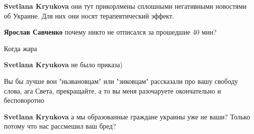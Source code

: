\begin{itemize}
\begin{itemize}
 
\textbf{Svetlana Kryukova} они тут прикорлмены сплошными негативными новостями об Украине. Для них они носят терапевтический эффект.


 
\textbf{Ярослав Савченко} почему никто не отписался за прошедшие 40 мин?

 
Когда жара

 
\textbf{Svetlana Kryukova} не было приказа)

 
Вы бы лучше вон "ньзвановцам" или "зиковцам" рассказали про вашу свободу слова,
ага \Laughey[1.0][white] Света, прекращайте, а то вы меня разочаруете окончательно и бесповоротно
🤣

 
\textbf{Svetlana Kryukova} а мы образованные граждане украины уже не ваши? Только потому что нас рассмешил ваш бред?

 

\end{itemize}
\end{itemize}
